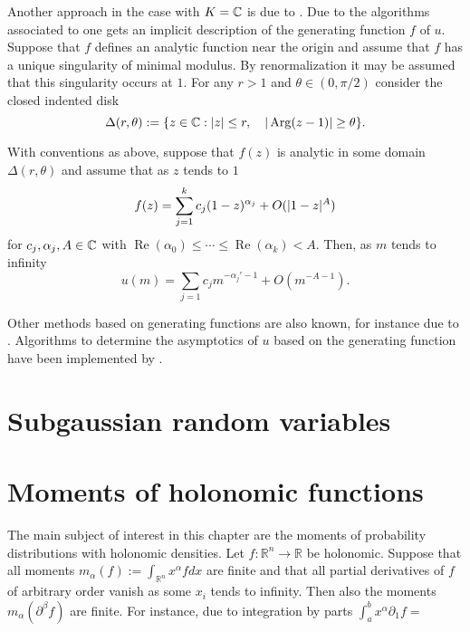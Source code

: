     Another approach in the case with $K = \mathbb{C}$ is due to \cite{flajolet1990singularity}.
    Due to the algorithms associated to  one gets an implicit description of the generating function $f$ of $u$.
    Suppose that $f$ defines an analytic function near the origin and assume that $f$ has a unique singularity of minimal modulus.
    By renormalization it may be assumed that this singularity occurs at $1$.
    For any $r>1$ and $\theta \in (0,\pi/2)$  consider the closed indented disk
    $$\Delta(r,\theta) := \{z\in \mathbb{C}: \vert z \vert\leq r, \quad \vert \operatorname{Arg}(z-1) \vert\geq \theta\}.$$
    \begin{theorem}{\cite[Corollary 3]{flajolet1990singularity}}
      With conventions as above, suppose that $f(z)$ is analytic in some domain $\Delta(r,\theta)$ and assume that as $z$ tends to $1$
      $$f(z) = \sum_{j=1}^k c_{j}(1-z)^{\alpha_j} + O(\vert 1-z \vert^A)$$
      for $c_j,\alpha_j,A\in \mathbb{C}$ with $\operatorname{Re}(\alpha_0)\leq \cdots \leq \operatorname{Re}(\alpha_k)<A$.
      Then, as $m$ tends to infinity
      $$u(m) = \sum_{j=1}c_j m^{-\alpha_j' - 1} + O(m^{-A -1}).$$
    \end{theorem}
    Other methods based on generating functions are also known, for instance due to \cite{hayman1956generalisation}.
    Algorithms to determine the asymptotics of $u$ based on the generating function have been implemented by \cite{salvy1991examples}.
\section{Subgaussian random variables}\label{sec: SubGSubE}
\section{Moments of holonomic functions}\label{sec: RecursionMoment}
The main subject of interest in this chapter are the moments of probability distributions with holonomic densities.
Let $f:\mathbb{R}^n \to \mathbb{R}$ be holonomic.
Suppose that all moments $m_\alpha(f) := \int_{\mathbb{R}^n} x^\alpha f dx$ are finite and that all partial derivatives of $f$ of arbitrary order vanish as some $x_i$ tends to infinity.
Then also the moments $m_\alpha(\partial^\beta f)$ are finite.
For instance, due to integration by parts $\int_a^{b} x^\alpha \partial_1 f = $
